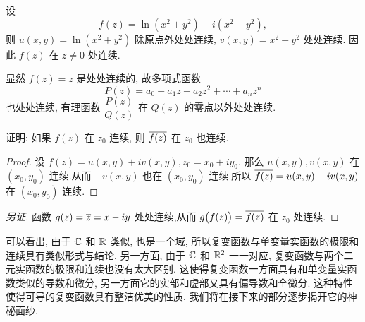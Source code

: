 \begin{example}\delspace
  \begin{enumnopar}
    \item 设
    \[f(z)=\ln(x^2+y^2)+i(x^2-y^2),\]
    则 $u(x,y)=\ln(x^2+y^2)$ 除原点外处处连续, $v(x,y)=x^2-y^2$ 处处连续. 因此 $f(z)$ 在 $z\neq0$ 处连续.
    \item 显然 $f(z)=z$ 是处处连续的, 故多项式函数
    \[P(z)=a_0+a_1z+a_2z^2+\cdots+a_nz^n\]
    也处处连续, 有理函数 $\dfrac{P(z)}{Q(z)}$ 在 $Q(z)$ 的零点以外处处连续.
  \end{enumnopar}
\end{example}

\begin{example}
  证明: 如果 $f(z)$ 在 $z_0$ 连续, 则 $\overline{f(z)}$ 在 $z_0$ 也连续.
\end{example}

\begin{proof}
  设 $f(z)=u(x,y)+iv(x,y),z_0=x_0+iy_0$.
  那么 $u(x,y),v(x,y)$ 在 $(x_0,y_0)$ 连续.从而 $-v(x,y)$ 也在 $(x_0,y_0)$ 连续.所以 $\overline{f(z)}=u(x,y)-iv(x,y)$ 在 $(x_0,y_0)$ 连续.
\end{proof}
\begin{proof}[另证]
  函数 $g(z)=\overline z=x-iy$ 处处连续,从而 $g\bigl(f(z)\bigr)=\overline{f(z)}$ 在 $z_0$ 处连续.
\end{proof}

可以看出, 由于 ${\mathbb{C}}$ 和 ${\mathbb{R}}$ 类似, 也是一个域, 所以复变函数与单变量实函数的极限和连续具有类似形式与结论.
另一方面, 由于 ${\mathbb{C}}$ 和 ${\mathbb{R}}^2$ 一一对应, 复变函数与两个二元实函数的极限和连续也没有太大区别.
这使得复变函数一方面具有和单变量实函数类似的导数和微分, 另一方面它的实部和虚部又具有偏导数和全微分.
这种特性使得可导的复变函数具有整洁优美的性质, 我们将在接下来的部分逐步揭开它的神秘面纱.





